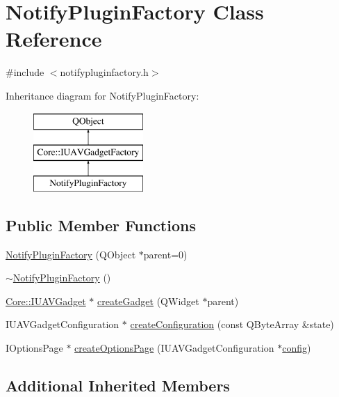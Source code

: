 \hypertarget{class_notify_plugin_factory}{\section{Notify\-Plugin\-Factory Class Reference}
\label{class_notify_plugin_factory}
}


{\ttfamily \#include $<$notifypluginfactory.\-h$>$}

Inheritance diagram for Notify\-Plugin\-Factory\-:\begin{figure}[H]
\begin{center}
\leavevmode
\includegraphics[height=3.000000cm]{class_notify_plugin_factory}
\end{center}
\end{figure}
\subsection*{Public Member Functions}
\begin{DoxyCompactItemize}
\item 
\hyperlink{group__notifyplugin_ga3c91b1f9c5a354b8d5886dd3cff94126}{Notify\-Plugin\-Factory} (Q\-Object $\ast$parent=0)
\item 
\hyperlink{group__notifyplugin_ga312b0e9ce81892b5388bb21c4f4c426a}{$\sim$\-Notify\-Plugin\-Factory} ()
\item 
\hyperlink{class_core_1_1_i_u_a_v_gadget}{Core\-::\-I\-U\-A\-V\-Gadget} $\ast$ \hyperlink{group__notifyplugin_gaf83c2c3d9f1f2adfa2629f31821c012e}{create\-Gadget} (Q\-Widget $\ast$parent)
\item 
I\-U\-A\-V\-Gadget\-Configuration $\ast$ \hyperlink{group__notifyplugin_gade4f4f78125740032a0bd6d3e920d131}{create\-Configuration} (const Q\-Byte\-Array \&state)
\item 
I\-Options\-Page $\ast$ \hyperlink{group__notifyplugin_ga04b86d8ce232e043459331bd3ab5d05d}{create\-Options\-Page} (I\-U\-A\-V\-Gadget\-Configuration $\ast$\hyperlink{deflate_8c_a4473b5227787415097004fd39f55185e}{config})
\end{DoxyCompactItemize}
\subsection*{Additional Inherited Members}


